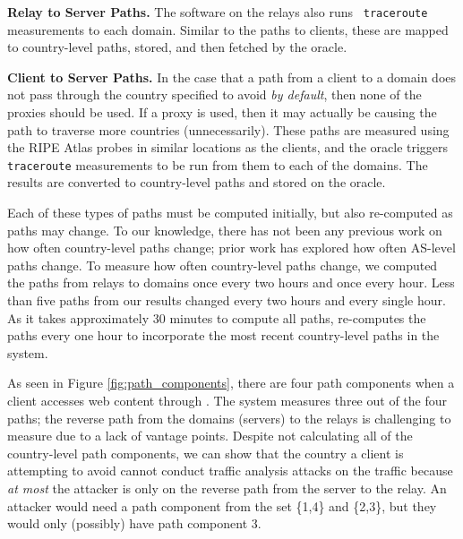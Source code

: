 {\bf Relay to Server Paths.} The software on the relays also runs {\tt 
traceroute} measurements to each domain.  Similar to the paths to clients, these 
are mapped to country-level paths, stored, and then fetched by the oracle.

{\bf Client to Server Paths.} In the case that a path from a client to a 
domain does not pass through the country specified to avoid {\it by default}, 
then none of the proxies should be used.  If a proxy is used, then it may 
actually be causing the path to traverse more countries (unnecessarily).  These 
paths are measured using the RIPE Atlas probes in similar locations as the 
clients, and the oracle triggers {\tt traceroute} measurements to be run from 
them to each of the domains.  The results are converted to country-level paths 
and stored on the oracle.  

Each of these types of paths must be computed initially, but also re-computed 
as paths may change.  To our knowledge, there has not been any previous work 
on how often country-level paths change; prior work has explored how often 
AS-level paths change.  To measure how often country-level paths change, we 
computed the paths from relays to domains once every two hours and once every 
hour.  Less than five paths from our results changed every two hours and every 
single hour. As it takes approximately 30 minutes to 
compute all paths, \system{} re-computes the paths every one hour to incorporate 
the most recent country-level paths in the system.


As seen in Figure \ref{fig:path_components}, there are four path components 
when a client accesses web content through \system{}.  The system measures three 
out of the four paths; the reverse path from the domains (servers) to the relays 
is challenging to measure due to a lack of vantage points.  Despite not 
calculating all of the country-level path components, we can show that the 
country a client is attempting to avoid cannot conduct traffic analysis attacks 
on the traffic because {\it at most} the attacker is only on the reverse path 
from the server to the relay.  An attacker would need a path component from the 
set \{1,4\} and \{2,3\}, but they would only (possibly) have path component 3.

